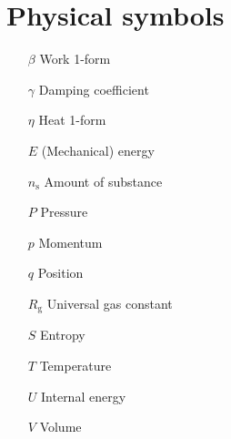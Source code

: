 \section*{Physical symbols}
\begin{itemize}[itemsep=0pt, leftmargin=2cm, labelsep=0cm, labelwidth=1.9cm, align=left]
    \item[$\beta$] Work 1-form
    \item[$\gamma$] Damping coefficient
    \item[$\eta$] Heat 1-form
%
    \item[$E$] (Mechanical) energy
    \item[$n_\text{s}$] Amount of substance
    \item[$P$] Pressure
    \item[$p$] Momentum
    \item[$q$] Position
    \item[$R_\text{g}$] Universal gas constant
    \item[$S$] Entropy
    \item[$T$] Temperature
    \item[$U$] Internal energy
    \item[$V$] Volume
%
%
%
\end{itemize}